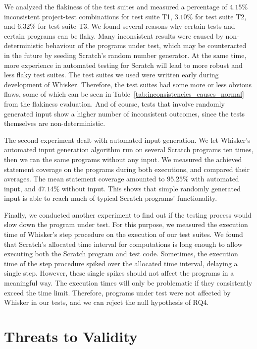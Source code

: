 We analyzed the flakiness of the test suites and measured a percentage of $4.15\%$ inconsistent project-test combinations for test suite T1,
$3.10\%$ for test suite T2, and $6.32\%$ for test suite T3.
We found several reasons why certain tests and certain programs can be flaky.
Many inconsistent results were caused by non-deterministic behaviour of the programs under test,
which may be counteracted in the future by seeding Scratch's random number generator.
At the same time, more experience in automated testing for Scratch will lead to more robust and less flaky test suites.
The test suites we used were written early during development of Whisker.
Therefore, the test suites had some more or less obvious flaws,
some of which can be seen in Table~\ref{tab:inconsistencies_causes_normal} from the flakiness evaluation.
And of course, tests that involve randomly generated input show a higher number of inconsistent outcomes,
since the tests themselves are non-deterministic.
\parspace

The second experiment dealt with automated input generation.
We let Whisker's automated input generation algorithm run on several Scratch programs ten times,
then we ran the same programs without any input.
We measured the achieved statement coverage on the programs during both executions,
and compared their averages.
The mean statement coverage amounted to $95.25\%$ with automated input, and $47.14\%$ without input.
This shows that simple randomly generated input is able to reach much of typical Scratch programs' functionality.
\parspace

Finally, we conducted another experiment to find out
if the testing process would slow down the program under test.
For this purpose, we measured the execution time of Whisker's step procedure on the execution of our test suites.
We found that Scratch's allocated time interval for computations is long enough to
allow executing both the Scratch program and test code.
Sometimes, the execution time of the step procedure spiked over the allocated time interval,
delaying a single step.
However, these single spikes should not affect the programs in a meaningful way.
The execution times will only be problematic if they consistently exceed the time limit.
Therefore, programs under test were not affected by Whisker in our tests, and we can reject the null hypothesis of RQ4.


\section{Threats to Validity}
\label{sec:threats_to_validity}

